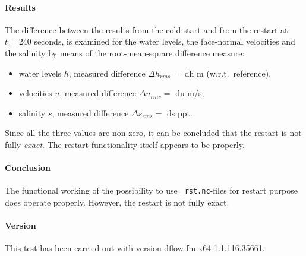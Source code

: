 \paragraph*{Results}
The difference between the results from the cold start and from the restart at $t = 240$ seconds, is examined for the water levels, the face-normal velocities and the salinity by means of the root-mean-square difference measure:
\begin{itemize}
\item water levels $h$, measured difference $\Delta h_{rms} = $ {dh} m (w.r.t.\ reference),
\item velocities $u$, measured difference $\Delta u_{rms} = $ {du} m/s,
\item salinity $s$, measured difference $\Delta s_{rms} = $ {ds} ppt.
\end{itemize}
Since all the three values are non-zero, it can be concluded that the restart is not fully \emph{exact}. The restart functionality itself appears to be properly.


\paragraph*{Conclusion}
The functional working of the possibility to use \texttt{\_rst.nc}-files for restart purpose does operate properly. However, the restart is not fully exact.


\paragraph*{Version}
This test has been carried out with version dflow-fm-x64-1.1.116.35661.



